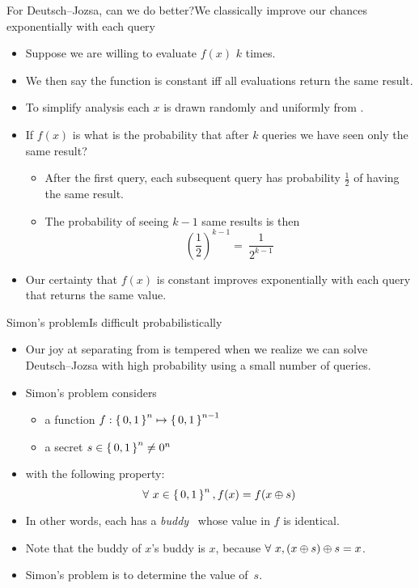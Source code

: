 \begin{frame}{For Deutsch--Jozsa, can we do better?}{We classically improve our chances exponentially with each query}

\begin{itemize}[<+->]
    \item Suppose we are willing to evaluate $f(x)$ $k$ times.
    \item We then say the function is constant iff all evaluations return the same result.
    \item To simplify analysis each $x$ is drawn randomly and uniformly from .
    \item If $f(x)$ is  what is the probability that after $k$ queries we have seen only the same result?
    \begin{itemize}
        \item After the first query, each subsequent query has probability $\frac{1}{2}$ of having the same result.
        \item The probability of seeing $k-1$ same results is then \[\left(\frac{1}{2}\right)^{k-1} =\ \frac{1}{2^{k-1}}\]
    \end{itemize}
    \item Our certainty that $f(x)$ is constant improves exponentially with each query that returns the same value.
\end{itemize}
    
\end{frame}

\begin{frame}{Simon's problem}{Is difficult probabilistically}
\begin{itemize}[<+->]
    \item Our joy at separating  from  is tempered when we realize we can solve Deutsch--Jozsa with high probability using a small number of queries.
    \item Simon's problem considers 
    \begin{itemize}
        \item a function $f: \left\{\,0,1\,\right\}^{n}\mapsto \left\{\,0,1\,\right\}^{n-1}$
        \item a secret $s\in \left\{\,0,1\,\right\}^{n} \not= 0^{n}$
    \end{itemize}
    \item with the following property:
    \[\forall\ x\in \left\{\,0,1\,\right\}^{n}, f(x)=f(x\oplus s) \]
    \item In other words, each  has a \emph{buddy}~ whose value in $f$ is identical.
    \item Note that the buddy of $x$'s buddy is $x$, because
    $\forall\ x, (x\oplus s)\oplus s=x$.
    \item \alert{Simon's problem is to determine the value of~$s$.}
\end{itemize}
\end{frame}

